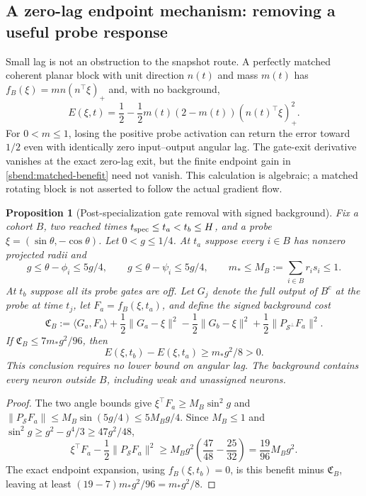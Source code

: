 \documentclass[11pt]{article}
\newtheorem{proposition}[theorem]{Proposition}
\theoremstyle{remark}
\begin{document}
\subsection{A zero-lag endpoint mechanism: removing a useful probe response}

Small lag is not an obstruction to the snapshot route. A perfectly
matched coherent planar block with unit direction $n(t)$ and mass $m(t)$
has $f_B(\xi)=m n(n^\top\xi)_+$ and, with no background,
\begin{equation}\label{sbend:matched-benefit}
 E(\xi,t)=\frac12-\frac12m(t)(2-m(t))(n(t)^\top\xi)_+^2.
\end{equation}
For $0<m\le1$, losing the positive probe activation can return the
error toward $1/2$ even with identically zero input--output angular lag.
The gate-exit derivative vanishes at the exact zero-lag exit, but the
finite endpoint gain in \eqref{sbend:matched-benefit} need not vanish.
This calculation is algebraic; a matched rotating block is not asserted
to follow the actual gradient flow.

\begin{proposition}[Post-specialization gate removal with signed background]
\label{sbend:sweep-certificate}
Fix a cohort $B$, two reached times $t_{\rm spec}\le t_a<t_b\le H$,
and a probe $\xi=(\sin\theta,-\cos\theta)$. Let $0<g\le1/4$.
At $t_a$ suppose every $i\in B$ has nonzero projected radii and
\[
 g\le\theta-\phi_i\le5g/4,\qquad
 g\le\theta-\psi_i\le5g/4,\qquad
 m_*\le M_B:=\sum_{i\in B}r_is_i\le1.
\]
At $t_b$ suppose all its probe gates are off. Let $G_j$ denote the full
output of $B^c$ at the probe at time $t_j$, let
$F_a=f_B(\xi,t_a)$, and define the signed background cost
\begin{equation}\label{sbend:background-cost}
 \mathfrak C_B:=\langle G_a,F_a\rangle
 +\frac12\|G_a-\xi\|^2-\frac12\|G_b-\xi\|^2
 +\frac12\|P_{\mathcal S^\perp}F_a\|^2.
\end{equation}
If $\mathfrak C_B\le7m_*g^2/96$, then
\begin{equation}\label{sbend:sweep-gap}
 E(\xi,t_b)-E(\xi,t_a)\ge m_*g^2/8>0.
\end{equation}
This conclusion requires no lower bound on angular lag. The background
contains every neuron outside $B$, including weak and unassigned neurons.
\end{proposition}
\begin{proof}
The two angle bounds give
$\xi^\top F_a\ge M_B\sin^2g$ and
$\|P_{\mathcal S}F_a\|\le M_B\sin(5g/4)\le5M_Bg/4$.
Since $M_B\le1$ and
$\sin^2g\ge g^2-g^4/3\ge47g^2/48$,
\[
 \xi^\top F_a-\frac12\|P_{\mathcal S}F_a\|^2
 \ge M_Bg^2\left(\frac{47}{48}-\frac{25}{32}\right)
 =\frac{19}{96}M_Bg^2.
\]
The exact endpoint expansion, using $f_B(\xi,t_b)=0$, is this
benefit minus $\mathfrak C_B$, leaving at least
$(19-7)m_*g^2/96=m_*g^2/8$.
\end{proof}
\end{document}

